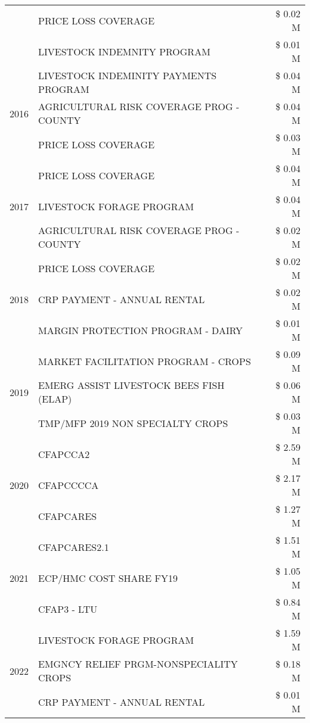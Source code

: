\begin{tabular}{llr}
 & PRICE LOSS COVERAGE & \$ 0.02 M \\
 & LIVESTOCK INDEMNITY PROGRAM & \$ 0.01 M \\
\cline{1-3}
\multirow[t]{3}{*}{2016} & LIVESTOCK INDEMINITY PAYMENTS PROGRAM & \$ 0.04 M \\
 & AGRICULTURAL RISK COVERAGE PROG - COUNTY & \$ 0.04 M \\
 & PRICE LOSS COVERAGE & \$ 0.03 M \\
\cline{1-3}
\multirow[t]{3}{*}{2017} & PRICE LOSS COVERAGE & \$ 0.04 M \\
 & LIVESTOCK FORAGE PROGRAM & \$ 0.04 M \\
 & AGRICULTURAL RISK COVERAGE PROG - COUNTY & \$ 0.02 M \\
\cline{1-3}
\multirow[t]{3}{*}{2018} & PRICE LOSS COVERAGE & \$ 0.02 M \\
 & CRP PAYMENT - ANNUAL RENTAL & \$ 0.02 M \\
 & MARGIN PROTECTION PROGRAM - DAIRY & \$ 0.01 M \\
\cline{1-3}
\multirow[t]{3}{*}{2019} & MARKET FACILITATION PROGRAM - CROPS & \$ 0.09 M \\
 & EMERG ASSIST LIVESTOCK BEES FISH (ELAP) & \$ 0.06 M \\
 & TMP/MFP 2019 NON SPECIALTY CROPS & \$ 0.03 M \\
\cline{1-3}
\multirow[t]{3}{*}{2020} & CFAPCCA2 & \$ 2.59 M \\
 & CFAPCCCCA & \$ 2.17 M \\
 & CFAPCARES & \$ 1.27 M \\
\cline{1-3}
\multirow[t]{3}{*}{2021} & CFAPCARES2.1 & \$ 1.51 M \\
 & ECP/HMC COST SHARE FY19 & \$ 1.05 M \\
 & CFAP3 - LTU & \$ 0.84 M \\
\cline{1-3}
\multirow[t]{3}{*}{2022} & LIVESTOCK FORAGE PROGRAM & \$ 1.59 M \\
 & EMGNCY RELIEF PRGM-NONSPECIALITY CROPS & \$ 0.18 M \\
 & CRP PAYMENT - ANNUAL RENTAL & \$ 0.01 M \\
\cline{1-3}
\bottomrule
\end{tabular}
